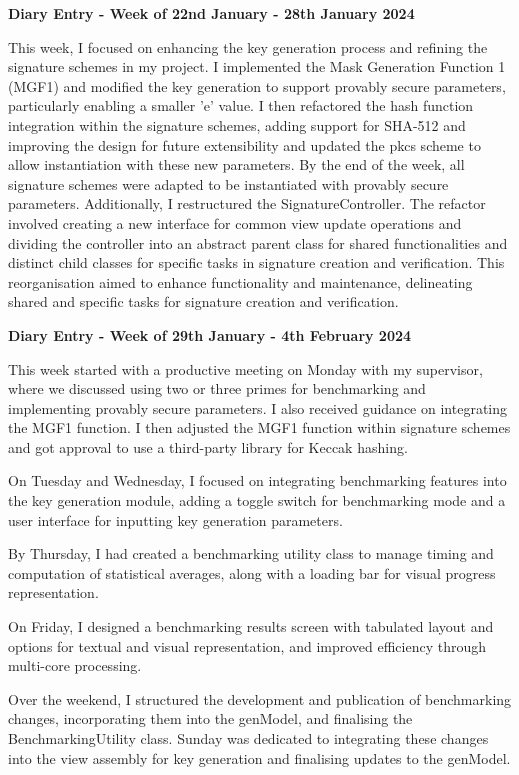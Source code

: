 \documentclass[]{final_report}
\theoremstyle{definition}
\begin{document}
\textbf{Diary Entry - Week of 22nd January - 28th January 2024}

This week, I focused on enhancing the key generation process and refining the signature schemes in
my project. I implemented the Mask Generation Function 1 (MGF1) and modified the key generation to
support provably secure parameters, particularly enabling a smaller 'e' value. I then refactored the
hash function integration within the signature schemes, adding support for SHA-512 and improving the
design for future extensibility and updated the pkcs scheme to allow instantiation with
these new parameters. By the end of the week, all signature schemes were adapted to be instantiated
with provably secure parameters. Additionally, I restructured the SignatureController. The refactor
involved creating a new interface for common view update operations and dividing the controller into
an abstract parent class for shared functionalities and distinct child classes for specific tasks in
signature creation and verification. This reorganisation aimed to enhance functionality and
maintenance, delineating shared and specific tasks for signature creation and verification.

\textbf{Diary Entry - Week of 29th January - 4th February 2024}

This week started with a productive meeting on Monday with my supervisor, where we discussed using
two or three primes for benchmarking and implementing provably secure parameters. I also received
guidance on integrating the MGF1 function. I then adjusted the MGF1 function within signature
schemes and got approval to use a third-party library for Keccak hashing.

On Tuesday and Wednesday, I focused on integrating benchmarking features into the key generation
module, adding a toggle switch for benchmarking mode and a user interface for inputting key
generation parameters.

By Thursday, I had created a benchmarking utility class to manage timing and computation of
statistical averages, along with a loading bar for visual progress representation.

On Friday, I designed a benchmarking results screen with tabulated layout and options for textual
and visual representation, and improved efficiency through multi-core processing.

Over the weekend, I structured the development and publication of benchmarking changes,
incorporating them into the genModel, and finalising the BenchmarkingUtility class. Sunday was
dedicated to integrating these changes into the view assembly for key generation and finalising
updates to the genModel.
\end{document}

